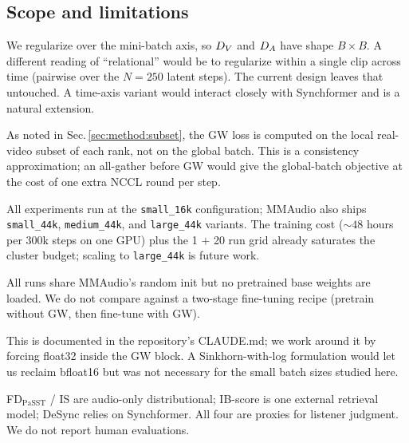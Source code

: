 \subsection{Scope and limitations}
\begin{description}[leftmargin=2em]
  \item[Batch-level, not stream-level.] We regularize over the
    mini-batch axis, so $D_{V}$ and $D_{A}$ have shape $B \times B$.
    A different reading of ``relational'' would be to regularize
    within a single clip across time (pairwise over the $N=250$
    latent steps). The current design leaves that untouched. A
    time-axis variant would interact closely with Synchformer and
    is a natural extension.
  \item[Per-rank GW under DDP.] As noted in
    Sec.\,\ref{sec:method:subset}, the GW loss is computed on the
    local real-video subset of each rank, not on the global batch.
    This is a consistency approximation; an all-gather before GW
    would give the global-batch objective at the cost of one
    extra NCCL round per step.
  \item[Small\_16k only.] All experiments run at the
    \texttt{small\_16k} configuration; MMAudio also ships
    \texttt{small\_44k}, \texttt{medium\_44k}, and
    \texttt{large\_44k} variants. The training cost ($\sim\!48$
    hours per 300k steps on one GPU) plus the 1 $+$ 20 run grid
    already saturates the cluster budget; scaling to
    \texttt{large\_44k} is future work.
  \item[No training-from-scratch comparisons.] All runs share
    MMAudio's random init but no pretrained base weights are
    loaded. We do not compare against a two-stage fine-tuning
    recipe (pretrain without GW, then fine-tune with GW).
  \item[Sinkhorn numerics are brittle in bfloat16.] This is
    documented in the repository's CLAUDE.md; we work around it
    by forcing float32 inside the GW block. A Sinkhorn-with-log
    formulation would let us reclaim bfloat16 but was not
    necessary for the small batch sizes studied here.
  \item[Metric limitations.] FD$_{\text{PaSST}}$ / IS are
    audio-only distributional; IB-score is one external retrieval
    model; DeSync relies on Synchformer. All four are proxies for
    listener judgment. We do not report human evaluations.
\end{description}

